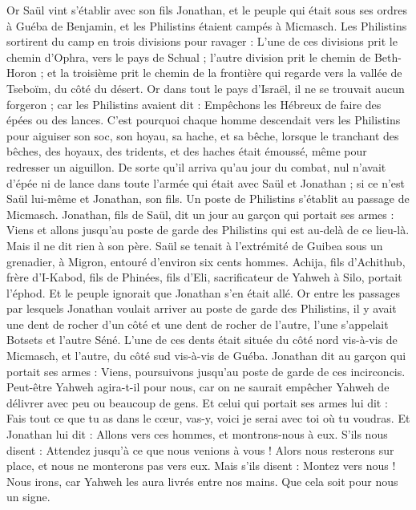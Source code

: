 \begin{multicols}{2}
Or Saül vint s'établir avec son fils Jonathan, et le peuple qui était sous ses ordres à Guéba de Benjamin, et les Philistins étaient campés à Micmasch.
Les Philistins sortirent du camp en trois divisions pour ravager : L'une de ces divisions prit le chemin d'Ophra, vers le pays de Schual ;
l'autre division prit le chemin de Beth-Horon ; et la troisième prit le chemin de la frontière qui regarde vers la vallée de Tseboïm, du côté du désert.
Or dans tout le pays d'Israël, il ne se trouvait aucun forgeron ; car les Philistins avaient dit : Empêchons les Hébreux de faire des épées ou des lances.
C'est pourquoi chaque homme descendait vers les Philistins pour aiguiser son soc, son hoyau, sa hache, et sa bêche,
lorsque le tranchant des bêches, des hoyaux, des tridents, et des haches était émoussé, même pour redresser un aiguillon.
De sorte qu'il arriva qu'au jour du combat, nul n'avait d'épée ni de lance dans toute l'armée qui était avec Saül et Jonathan ; si ce n'est Saül lui-même et Jonathan, son fils.
Un poste de Philistins s'établit au passage de Micmasch.
\VerseOne{}Jonathan, fils de Saül, dit un jour au garçon qui portait ses armes : Viens et allons jusqu'au poste de garde des Philistins qui est au-delà de ce lieu-là. Mais il ne dit rien à son père.
Saül se tenait à l'extrémité de Guibea sous un grenadier, à Migron, entouré d'environ six cents hommes.
Achija, fils d'Achithub, frère d'I-Kabod, fils de Phinées, fils d'Eli, sacrificateur de Yahweh à Silo, portait l'éphod. Et le peuple ignorait que Jonathan s'en était allé.
Or entre les passages par lesquels Jonathan voulait arriver au poste de garde des Philistins, il y avait une dent de rocher d'un côté et une dent de rocher de l'autre, l'une s'appelait Botsets et l'autre Séné.
L'une de ces dents était située du côté nord vis-à-vis de Micmasch, et l'autre, du côté sud vis-à-vis de Guéba.
Jonathan dit au garçon qui portait ses armes : Viens, poursuivons jusqu'au poste de garde de ces incirconcis. Peut-être Yahweh agira-t-il pour nous, car on ne saurait empêcher Yahweh de délivrer avec peu ou beaucoup de gens.
Et celui qui portait ses armes lui dit : Fais tout ce que tu as dans le cœur, vas-y, voici je serai avec toi où tu voudras.
Et Jonathan lui dit : Allons vers ces hommes, et montrons-nous à eux.
S'ils nous disent : Attendez jusqu'à ce que nous venions à vous ! Alors nous resterons sur place, et nous ne monterons pas vers eux.
Mais s'ils disent : Montez vers nous ! Nous irons, car Yahweh les aura livrés entre nos mains. Que cela soit pour nous un signe.

\end{multicols}
